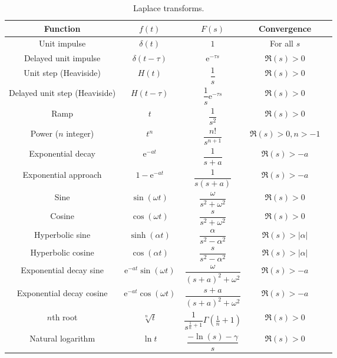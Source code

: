 \documentclass[fleqn]{article}
\newcommand{\me}{\mathrm{e}}
\begin{document}
\begin{table}[!p]
\centering
\caption{Laplace transforms.}
\label{tab:laplacetransforms}
\renewcommand{\arraystretch}{2}
\renewcommand{\tabcolsep}{0.4cm}
\begin{tabular}{ccScc}
\toprule
Function & $f(t)$ & $F(s)$ & Convergence\\
\midrule
Unit impulse & $\delta(t)$ & $1$ & For all $s$ \\
Delayed unit impulse & $\delta(t-\tau)$ & $\me^{-\tau s}$ & $\Re(s)>0$ \\
Unit step (Heaviside) & $H(t)$ & $\dfrac{1}{s}$ & $\Re(s)>0$ \\
Delayed unit step (Heaviside) & $H(t-\tau)$ & $\dfrac{1}{s}\me^{-\tau s}$ & $\Re(s)>0$ \\
Ramp & $t$ & $\dfrac{1}{s^2}$ & $\Re(s)>0$ \\
Power ($n$ integer) & $t^n$ & $\dfrac{n!}{s^{n+1}}$ & $\Re(s)>0, n>-1$ \\
Exponential decay & $\me^{-at}$ & $\dfrac{1}{s+a}$ & $\Re(s)>-a$ \\
Exponential approach & $1-\me^{-at}$ & $\dfrac{1}{s(s+a)}$ & $\Re(s)>-a$ \\
Sine & $\sin(\omega t)$ & $\dfrac{\omega}{s^2 + \omega^2}$ & $\Re(s)>0$ \\
Cosine & $\cos(\omega t)$ & $\dfrac{s}{s^2 + \omega^2}$ & $\Re(s)>0$ \\
Hyperbolic sine & $\sinh(\alpha t)$ & $\dfrac{\alpha}{s^2-\alpha^2}$ & $\Re(s)> |\alpha|$ \\
Hyperbolic cosine & $\cos(\alpha t)$ & $\dfrac{s}{s^2-\alpha^2}$ & $\Re(s)> |\alpha|$ \\
Exponential decay sine & $\me^{-at}\sin(\omega t)$ & $\dfrac{\omega}{(s+a)^2 + \omega^2}$ & $\Re(s)>-a$ \\
Exponential decay cosine & $\me^{-at}\cos(\omega t)$ & $\dfrac{s+a}{(s+a)^2 + \omega^2}$ & $\Re(s)>-a$ \\
$n$th root & $\sqrt[n]{t}$ & $\dfrac{1}{s^{\frac{1}{n}+1}}\Gamma\left(\frac{1}{n}+1\right)$ & $\Re(s)>0$ \\
Natural logarithm & $\ln t$ & $\dfrac{-\ln (s) -\gamma}{s}$ & $\Re(s)>0$ \\
\bottomrule
\end{tabular}
\end{table}
\end{document}
